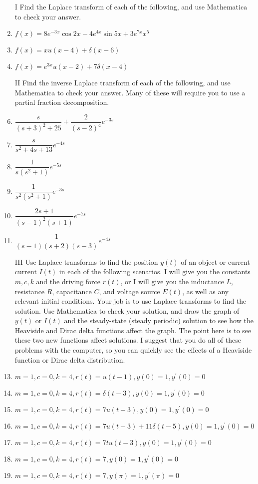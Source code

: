 \begin{enumerate}
\item[I] Find the Laplace transform of each of the following, and use Mathematica to check your answer.
\item $f(x) = 8e^{-3x}\cos 2x -4e^{4x}\sin 5x+3e^{7x}x^5$
\item $f(x) = xu(x-4)+\delta(x-6)$
\item $f(x) = e^{3x}u(x-2)+7\delta(x-4)$

\item[II] Find the inverse Laplace transform of each of the following, and use Mathematica to check your answer. Many of these will require you to use a partial fraction decomposition.
\item $\dfrac{s}{(s+3)^2+25}+\dfrac{2}{(s-2)^4}e^{-3s}$
\item $\dfrac{s}{s^2+4s+13}e^{-4s}$
\item $\dfrac{1}{s(s^2+1)}e^{-5s}$
\item $\dfrac{1}{s^2(s^2+1)}e^{-3s}$
\item $\dfrac{2s+1}{(s-1)^2(s+1)}e^{-7s}$
\item $\dfrac{1}{(s-1)(s+2)(s-3)}e^{-4s}$

\item[III] Use Laplace transforms to find the position $y(t)$ of an object or current current $I(t)$ in each of the following scenarios. I will give you the constants $m,c,k$ and the driving force $r(t)$, or I will give you the inductance $L$, resistance $R$, capacitance $C$, and voltage source $E(t)$, as well as any relevant initial conditions.  Your job is to use Laplace transforms to find the solution. Use Mathematica to check your solution, and draw the graph of $y(t)$ or $I(t)$ and the steady-state (steady periodic) solution to see how the Heaviside and Dirac delta functions affect the graph. The point here is to see these two new functions affect solutions. I suggest that you do all of these problems with the computer, so you can quickly see the effects of a Heaviside function or Dirac delta distribution.
\item $m = 1, c = 0, k=4, r(t)=u(t-1), y(0)=1,y^\prime(0)=0$
\item $m = 1, c = 0, k=4, r(t)=\delta(t-3), y(0)=1,y^\prime(0)=0$
\item $m = 1, c = 0, k=4, r(t)=7u(t-3), y(0)=1,y^\prime(0)=0$
\item $m = 1, c = 0, k=4, r(t)=7u(t-3)+11\delta(t-5), y(0)=1,y^\prime(0)=0$
\item $m = 1, c = 0, k=4, r(t)=7t u(t-3), y(0)=1,y^\prime(0)=0$
\item $m = 1, c = 0, k=4, r(t)=7, y(0)=1,y^\prime(0)=0$
\item $m = 1, c = 0, k=4, r(t)=7, y(\pi)=1,y^\prime(\pi)=0$


\end{enumerate}
